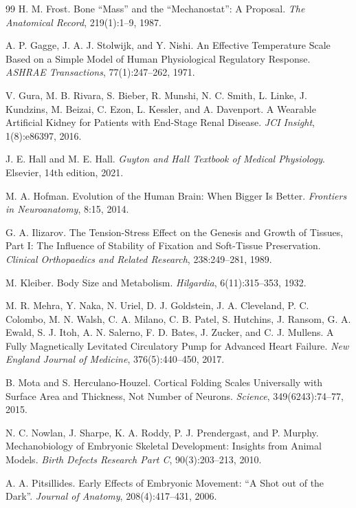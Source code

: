 \documentclass[11pt,openany]{book}
\theoremstyle{definition}
\theoremstyle{remark}
\begin{document}
\begin{thebibliography}{99}
 H. M. Frost. Bone ``Mass'' and the ``Mechanostat'': A Proposal. \emph{The Anatomical Record}, 219(1):1--9, 1987.

 A. P. Gagge, J. A. J. Stolwijk, and Y. Nishi. An Effective Temperature Scale Based on a Simple Model of Human Physiological Regulatory Response. \emph{ASHRAE Transactions}, 77(1):247--262, 1971.

 V. Gura, M. B. Rivara, S. Bieber, R. Munshi, N. C. Smith, L. Linke, J. Kundzins, M. Beizai, C. Ezon, L. Kessler, and A. Davenport. A Wearable Artificial Kidney for Patients with End-Stage Renal Disease. \emph{JCI Insight}, 1(8):e86397, 2016.

 J. E. Hall and M. E. Hall. \emph{Guyton and Hall Textbook of Medical Physiology}. Elsevier, 14th edition, 2021.

 M. A. Hofman. Evolution of the Human Brain: When Bigger Is Better. \emph{Frontiers in Neuroanatomy}, 8:15, 2014.

 G. A. Ilizarov. The Tension-Stress Effect on the Genesis and Growth of Tissues, Part I: The Influence of Stability of Fixation and Soft-Tissue Preservation. \emph{Clinical Orthopaedics and Related Research}, 238:249--281, 1989.

 M. Kleiber. Body Size and Metabolism. \emph{Hilgardia}, 6(11):315--353, 1932.

 M. R. Mehra, Y. Naka, N. Uriel, D. J. Goldstein, J. A. Cleveland, P. C. Colombo, M. N. Walsh, C. A. Milano, C. B. Patel, S. Hutchins, J. Ransom, G. A. Ewald, S. J. Itoh, A. N. Salerno, F. D. Bates, J. Zucker, and C. J. Mullens. A Fully Magnetically Levitated Circulatory Pump for Advanced Heart Failure. \emph{New England Journal of Medicine}, 376(5):440--450, 2017.

 B. Mota and S. Herculano-Houzel. Cortical Folding Scales Universally with Surface Area and Thickness, Not Number of Neurons. \emph{Science}, 349(6243):74--77, 2015.

 N. C. Nowlan, J. Sharpe, K. A. Roddy, P. J. Prendergast, and P. Murphy. Mechanobiology of Embryonic Skeletal Development: Insights from Animal Models. \emph{Birth Defects Research Part C}, 90(3):203--213, 2010.

 A. A. Pitsillides. Early Effects of Embryonic Movement: ``A Shot out of the Dark''. \emph{Journal of Anatomy}, 208(4):417--431, 2006.


\end{thebibliography}
\end{document}
